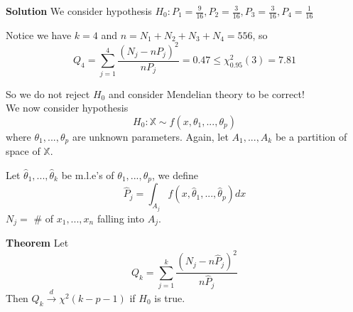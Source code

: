 \documentclass[a4paper,12pt]{article}
\begin{document}
\textbf{Solution} We consider hypothesis $H_0: P_1 = \frac{9}{16}, P_2 = \frac{3}{16}, P_3 = \frac{3}{16}, P_4 = \frac{1}{16}$

Notice we have $k = 4$ and $n = N_1 + N_2 + N_3 + N_4 = 556$, so
$$Q_4 = \sum_{j=1}^4 \frac{(N_j - nP_j)^2}{nP_j} = 0.47 \leq \chi^2_0.95(3) = 7.81$$

So we do not reject $H_0$ and consider Mendelian theory to be correct!\\

We now consider hypothesis
$$H_0: \mathbb{X} \sim f(x, \theta_1, ..., \theta_p)$$
where $\theta_1, ..., \theta_p$ are unknown parameters. Again, let $A_1, ..., A_k$ be a partition of space of $\mathbb{X}$.

Let $\hat{\theta}_1, ..., \hat{\theta}_k$ be m.l.e's of $\theta_1, ..., \theta_p$, we define
$$\hat{P}_j = \int_{A_j} f(x, \hat{\theta}_1, ..., \hat{\theta}_p)dx$$
$N_j = $ \# of $x_1, ..., x_n$ falling into $A_j$.

\textbf{Theorem} Let
$$Q_k = \sum_{j=1}^k \frac{(N_j - n\hat{P}_j)^2}{n\hat{P}_j}$$
Then $Q_k \overset{d}{\to} \chi^2(k-p-1)$ if $H_0$ is true.



\newpage

\end{document}
